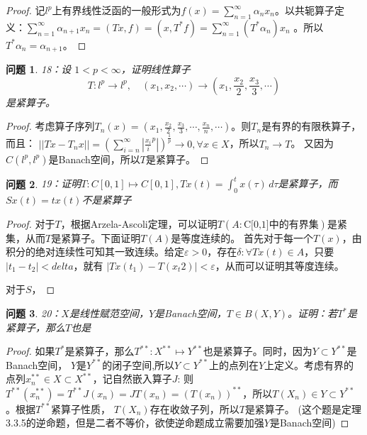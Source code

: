 \documentclass[a4paper, 12pt]{ctexart}
\newtheorem*{theorem}{问题}%
\begin{document}
\begin{proof}
记$l^p$上有界线性泛函的一般形式为$f(x)=\sum_{n=1}^\infty \alpha_n x_n$。以共轭算子定义：$\sum_{n=1}^\infty \alpha_{n+1} x_n=(Tx,f)=(x,T^*f)=\sum_{n=1}^\infty (T^*\alpha_n) x_n$
。所以$T^*\alpha_n=\alpha_{n+1}$。
\end{proof}

\begin{theorem}
18：设 $1 < p < \infty$，证明线性算子
$$T: l^p \rightarrow l^p, \quad (x_1, x_2, \cdots) \rightarrow (x_1, \frac{x_2}{2}, \frac{x_3}{3}, \cdots)$$
是紧算子。
\end{theorem}

\begin{proof}
考虑算子序列$T_n(x)=(x_1, \frac{x_2}{2}, \frac{x_3}{3}, \cdots, \frac{x_n}{n}, \cdots)$。则$T_n$是有界的有限秩算子，而且：
$||Tx-T_nx||=\left(\sum_{i=n}^\infty |\frac{x_i}{i}^p|\right)^{\frac{1}{p}}\to 0,\forall x\in X$，所以$T_n \to T$。
又因为$C(l^p,l^p)$是Banach空间，所以$T$是紧算子。
\end{proof}


\begin{theorem}
19：证明$T:C[0,1] \mapsto C[0,1],Tx(t)=\int_0^tx(\tau)\,d\tau$是紧算子，而$Sx(t)=tx(t)$不是紧算子
\end{theorem}

\begin{proof}
对于$T$，根据Arzela-Ascoli定理，可以证明$T(A:\text{C[0,1]中的有界集})$是紧集，从而$T$是紧算子。下面证明$T(A)$是等度连续的。
首先对于每一个$T(x)$，由积分的绝对连续性可知其一致连续。给定$\varepsilon>0$，存在$\delta:\forall Tx(t)\in A$，只要$|t_1-t_2|<delta$，就有
$|Tx(t_1)-T(x_t2)|<\varepsilon$，从而可以证明其等度连续。

对于$S$，
\end{proof}

\begin{theorem}
20：$X$是线性赋范空间，$Y$是Banach空间，$T \in B(X,Y)$。证明：若$T^*$是紧算子，那么$T$也是
\end{theorem}

\begin{proof}
如果$T^*$是紧算子，那么$T^{**}:X^{**} \mapsto Y^{**}$也是紧算子。同时，因为$Y \subset Y^{**}$是Banach空间，
$Y$是$Y^{**}$的闭子空间,所以$Y \subset Y^{**}$上的点列在$Y$上定义。考虑有界的点列$x_n^{**} \in X \subset X^{**}$，记自然嵌入算子$J$:
则$T^{**}(x_n^{**})=T^{**}J(x_n)=JT(x_n)=(T(x_n))^{**}$，所以$T(X_n) \in Y\subset Y^{**}$。根据$T^{**}$紧算子性质，
$T(X_n)$存在收敛子列，所以$T$是紧算子。
(这个题是定理3.3.5的逆命题，但是二者不等价，欲使逆命题成立需要加强$Y$是Banach空间)
\end{proof}
\end{document}
